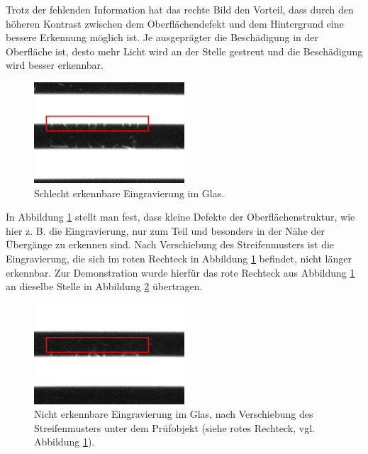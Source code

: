 \noindent
Trotz der fehlenden Information hat das rechte Bild den Vorteil, dass durch den höheren Kontrast zwischen dem Oberflächendefekt und dem Hintergrund eine bessere Erkennung möglich ist.
Je ausgeprägter die Beschädigung in der Oberfläche ist, desto mehr Licht wird an der Stelle gestreut und die Beschädigung wird besser erkennbar.

\begin{figure}[H]
	\centering
	\includegraphics[frame,width=0.5\textwidth]{03_sichtpruefungDurchLichtstreuung/verfahren/figures/minorScratch}
	\caption[Eingravierung im Glas]{Schlecht erkennbare Eingravierung im Glas.}
	\label{img:engraving}
\end{figure}

\noindent
In Abbildung \ref{img:engraving} stellt man fest, dass kleine Defekte der Oberflächenstruktur, wie hier z. B. die Eingravierung, nur zum Teil und besonders in der Nähe der Übergänge zu erkennen sind.
Nach Verschiebung des Streifenmusters ist die Eingravierung, die sich im roten Rechteck in Abbildung \ref{img:engraving} befindet, nicht länger erkennbar.
Zur Demonstration wurde hierfür das rote Rechteck aus Abbildung \ref{img:engraving} an dieselbe Stelle in Abbildung \ref{img:verschiebungEngraving} übertragen.

\begin{figure}[H]
	\centering
	\includegraphics[frame,width=0.5\textwidth]{03_sichtpruefungDurchLichtstreuung/verfahren/figures/minorScratchTwo}
	\caption[Eingravierung im Glas nach Verschiebung des Streifenmusters]{Nicht erkennbare Eingravierung im Glas, nach Verschiebung des Streifenmusters unter dem Prüfobjekt (siehe rotes Rechteck, vgl. Abbildung \ref{img:engraving}).}
	\label{img:verschiebungEngraving}
\end{figure}

